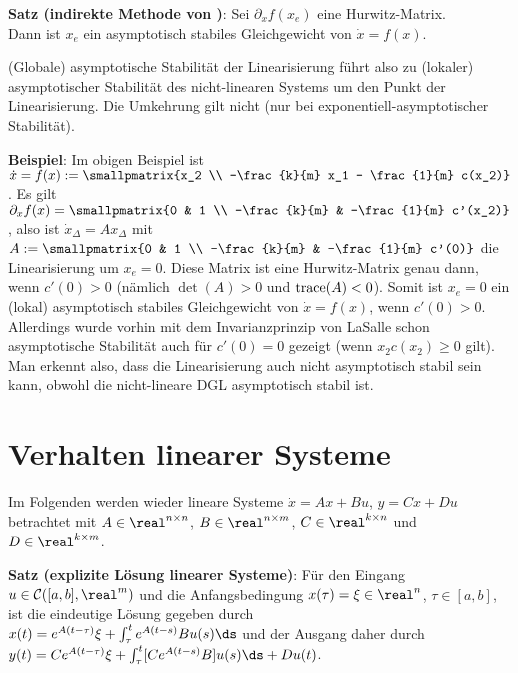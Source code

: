 \textbf{Satz (indirekte Methode von )}:
Sei $\partial_x f(x_e)$ eine Hurwitz-Matrix.\\
Dann ist $x_e$ ein asymptotisch stabiles Gleichgewicht von $\dot{x} = f(x)$.

(Globale) asymptotische Stabilität der Linearisierung führt also zu (lokaler) asymptotischer
Stabilität des nicht-linearen Systems um den Punkt der Linearisierung.
Die Umkehrung gilt nicht
(nur bei exponentiell-asymptotischer Stabilität).

\textbf{Beispiel}:
Im obigen Beispiel ist $\dot{x} = f(x) :=
\smallpmatrix{x_2 \\ -\frac{k}{m} x_1 - \frac{1}{m} c(x_2)}$.
Es gilt
$\partial_x f(x) = \smallpmatrix{0 & 1 \\ -\frac{k}{m} & -\frac{1}{m} c'(x_2)}$,
also ist $\dot{x}_\Delta = Ax_\Delta$ mit
$A := \smallpmatrix{0 & 1 \\ -\frac{k}{m} & -\frac{1}{m} c'(0)}$
die Linearisierung um $x_e = 0$.
Diese Matrix ist eine Hurwitz-Matrix genau dann, wenn $c'(0) > 0$
(nämlich $\det(A) > 0$ und $\operatorname{trace}(A) < 0$).
Somit ist $x_e = 0$ ein (lokal) asymptotisch stabiles Gleichgewicht von $\dot{x} = f(x)$,
wenn $c'(0) > 0$.
Allerdings wurde vorhin mit dem Invarianzprinzip von LaSalle
schon asymptotische Stabilität auch für $c'(0) = 0$ gezeigt (wenn $x_2 c(x_2) \ge 0$ gilt).
Man erkennt also, dass die Linearisierung auch nicht asymptotisch stabil sein kann,
obwohl die nicht-lineare DGL asymptotisch stabil ist.

\pagebreak

\section{%
    Verhalten linearer Systeme%
}

Im Folgenden werden wieder lineare Systeme $\dot{x} = Ax + Bu$, $y = Cx + Du$ betrachtet
mit $A \in \real^{n \times n}$, $B \in \real^{n \times m}$, $C \in \real^{k \times n}$ und
$D \in \real^{k \times m}$.

\textbf{Satz (explizite Lösung linearer Systeme)}:
Für den Eingang $u \in \C([a, b], \real^m)$ und die Anfangsbedingung $x(\tau) = \xi \in \real^n$,
$\tau \in [a, b]$, ist die eindeutige Lösung gegeben durch\\
$x(t) = e^{A(t - \tau)} \xi + \int_\tau^t e^{A(t - s)} Bu(s) \ds$
und der Ausgang daher durch\\
$y(t) = Ce^{A(t - \tau)} \xi + \int_\tau^t [Ce^{A(t - s)} B]u(s) \ds + Du(t)$.

